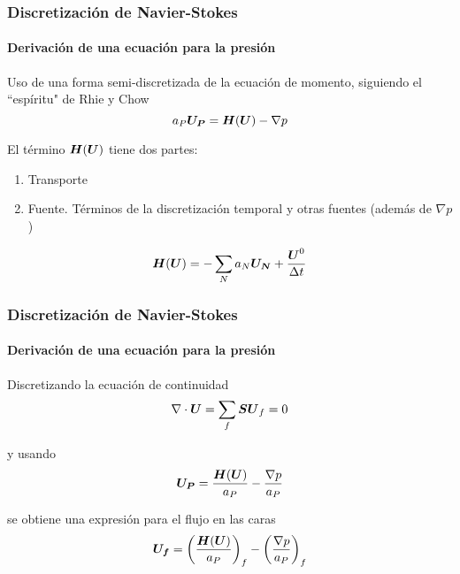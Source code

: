 \begin{frame}
    \frametitle{Discretizaci\'on de Navier-Stokes}
    \framesubtitle{Derivaci\'on de una ecuaci\'on para la presi\'on}
    
    Uso de una forma semi-discretizada de la ecuaci\'on de momento, siguiendo el \textquotedblleft esp\'iritu" de Rhie y Chow
    $$
        a_P \boldsymbol{U_P} = \boldsymbol{H} (\boldsymbol{U}) - \nabla p
    $$
    
    El t\'ermino $\boldsymbol{H} (\boldsymbol{U})$ tiene dos partes:
    \begin{enumerate}
        \item Transporte
        \item Fuente. T\'erminos de la discretizaci\'on temporal y otras fuentes (adem\'as de $\nabla p$)
    \end{enumerate}    
    $$
        \boldsymbol{H} (\boldsymbol{U}) = -\sum_N a_N \boldsymbol{U_N} + \frac{\boldsymbol{U}^0}{\Delta t}
    $$    

\end{frame} 


\begin{frame}
    \frametitle{Discretizaci\'on de Navier-Stokes}
    \framesubtitle{Derivaci\'on de una ecuaci\'on para la presi\'on}
    
    Discretizando la ecuaci\'on de continuidad
    $$  \nabla \cdot \boldsymbol{U} = \sum_f \boldsymbol{S} \boldsymbol{U}_f = 0   $$
    
    y usando 
    $$  \boldsymbol{U_P} = \frac{\boldsymbol{H} (\boldsymbol{U})}{a_P} - \frac{\nabla p}{a_P}   $$
    
    se obtiene una expresi\'on para el flujo en las caras
    $$ \boldsymbol{U_f} = \left ( \frac{\boldsymbol{H}(\boldsymbol{U})}{a_P} \right )_f - \left ( \frac{\nabla p}{a_P} \right )_f  $$


\end{frame} 




